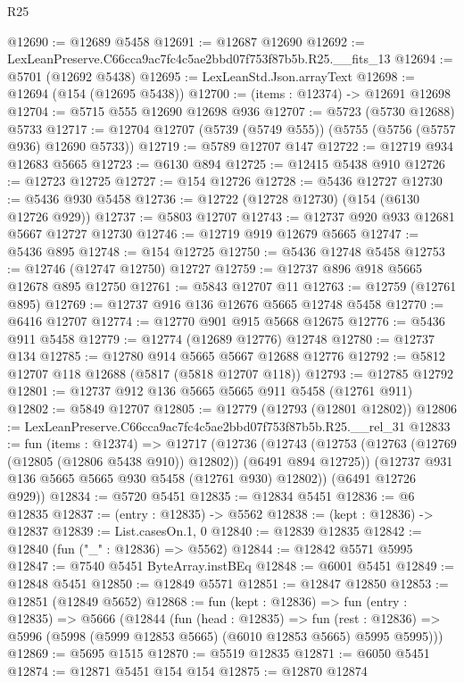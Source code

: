\begin{lexlean}{R25}
\begin{coremodule}
@12690 := @12689 @5458
@12691 := @12687 @12690
@12692 := LexLeanPreserve.C66cca9ac7fc4c5ae2bbd07f753f87b5b.R25.__fits_13
@12694 := @5701 (@12692 @5438)
@12695 := LexLeanStd.Json.arrayText
@12698 := @12694 (@154 (@12695 @5438))
@12700 := (items : @12374) -> @12691 @12698
@12704 := @5715 @555 @12690 @12698 @936
@12707 := @5723 (@5730 @12688) @5733
@12717 := @12704 @12707 (@5739 (@5749 @555)) (@5755 (@5756 (@5757 @936) @12690 @5733))
@12719 := @5789 @12707 @147
@12722 := @12719 @934 @12683 @5665
@12723 := @6130 @894
@12725 := @12415 @5438 @910
@12726 := @12723 @12725
@12727 := @154 @12726
@12728 := @5436 @12727
@12730 := @5436 @930 @5458
@12736 := @12722 (@12728 @12730) (@154 (@6130 @12726 @929))
@12737 := @5803 @12707
@12743 := @12737 @920 @933 @12681 @5667 @12727 @12730
@12746 := @12719 @919 @12679 @5665
@12747 := @5436 @895
@12748 := @154 @12725
@12750 := @5436 @12748 @5458
@12753 := @12746 (@12747 @12750) @12727
@12759 := @12737 @896 @918 @5665 @12678 @895 @12750
@12761 := @5843 @12707 @11
@12763 := @12759 (@12761 @895)
@12769 := @12737 @916 @136 @12676 @5665 @12748 @5458
@12770 := @6416 @12707
@12774 := @12770 @901 @915 @5668 @12675
@12776 := @5436 @911 @5458
@12779 := @12774 (@12689 @12776) @12748
@12780 := @12737 @134
@12785 := @12780 @914 @5665 @5667 @12688 @12776
@12792 := @5812 @12707 @118 @12688 (@5817 (@5818 @12707 @118))
@12793 := @12785 @12792
@12801 := @12737 @912 @136 @5665 @5665 @911 @5458 (@12761 @911)
@12802 := @5849 @12707
@12805 := @12779 (@12793 (@12801 @12802))
@12806 := LexLeanPreserve.C66cca9ac7fc4c5ae2bbd07f753f87b5b.R25.__rel_31
@12833 := fun (items : @12374) =>
  @12717
    (@12736
      (@12743
        (@12753 (@12763 (@12769 (@12805 (@12806 @5438 @910)) @12802)) (@6491 @894 @12725))
        (@12737 @931 @136 @5665 @5665 @930 @5458 (@12761 @930) @12802))
      (@6491 @12726 @929))
@12834 := @5720 @5451
@12835 := @12834 @5451
@12836 := @6 @12835
@12837 := (entry : @12835) -> @5562
@12838 := (kept : @12836) -> @12837
@12839 := List.casesOn.{1, 0}
@12840 := @12839 @12835
@12842 := @12840 (fun ("_" : @12836) => @5562)
@12844 := @12842 @5571 @5995
@12847 := @7540 @5451 ByteArray.instBEq
@12848 := @6001 @5451
@12849 := @12848 @5451
@12850 := @12849 @5571
@12851 := @12847 @12850
@12853 := @12851 (@12849 @5652)
@12868 := fun (kept : @12836) =>
  fun (entry : @12835) =>
  @5666
    (@12844
      (fun (head : @12835) =>
      fun (rest : @12836) => @5996 (@5998 (@5999 @12853 @5665) (@6010 @12853 @5665) @5995 @5995)))
@12869 := @5695 @1515
@12870 := @5519 @12835
@12871 := @6050 @5451
@12874 := @12871 @5451 @154 @154
@12875 := @12870 @12874

\end{coremodule}
\end{lexlean}
